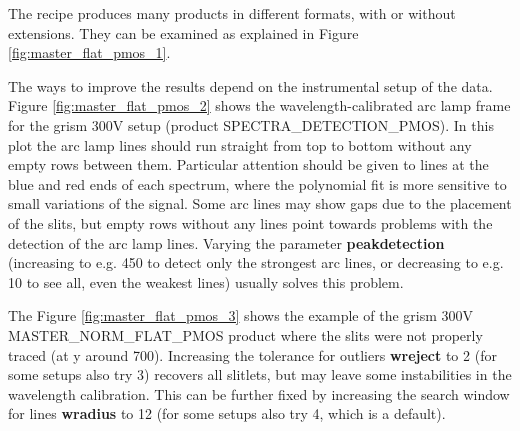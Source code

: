 The recipe produces many products in different formats, with or without extensions. They can be examined as explained in Figure \ref{fig:master_flat_pmos_1}.

The ways to improve the results depend on the instrumental setup of the data. Figure \ref{fig:master_flat_pmos_2} shows the wavelength-calibrated arc lamp frame for the grism 300V setup (product SPECTRA\_DETECTION\_PMOS). In this plot the arc lamp lines should run straight from top to bottom without any empty rows between them. Particular attention should be given to lines at the blue and red ends of each spectrum, where the polynomial fit is more sensitive to small variations of the signal. Some arc lines may show gaps due to the placement of the slits, but empty rows without any lines point towards problems with the detection of the arc lamp lines. Varying the parameter {\bf peakdetection} (increasing to e.g. 450 to detect only the strongest arc lines, or decreasing to e.g. 10 to see all, even the weakest lines) usually solves this problem.

The Figure \ref{fig:master_flat_pmos_3} shows the example of the grism 300V MASTER\_NORM\_FLAT\_PMOS product where the slits were not properly traced (at y around 700). Increasing the tolerance for outliers {\bf wreject} to 2 (for some setups also try 3) recovers all slitlets, but may leave some instabilities in the wavelength calibration. This can be further fixed by increasing the search window for lines {\bf wradius} to 12 (for some setups also try 4, which is a default).

